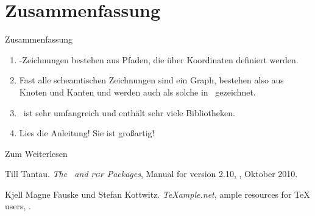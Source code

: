 \malte

\section*{Zusammenfassung}

\begin{frame}{Zusammenfassung}
  \begin{enumerate}
    \item \TikZ-Zeichnungen bestehen aus \alert{Pfaden}, die über \alert{Koordinaten} definiert werden.
    \item Fast alle scheamtischen Zeichnungen sind ein \alert{Graph}, bestehen also aus \alert{Knoten} und \alert{Kanten} und
      werden auch als solche in \TikZ\ gezeichnet.
    \item \TikZ\ ist sehr umfangreich und enthält \alert{sehr viele Bibliotheken}.
    \item \alert{Lies die Anleitung!} Sie ist großartig!
  \end{enumerate}
\end{frame}

\begin{Frame}{Zum Weiterlesen}
  \begin{mybib}
      Till Tantau.
      \newblock \emph{The \TikZ\ and \textsc{pgf} Packages},
      \newblock Manual for version 2.10,
      \newblock {}, Oktober 2010.

      Kjell Magne Fauske und Stefan Kottwitz.
      \newblock \emph{\TeX ample.net},
      \newblock ample resources for TeX users,
      \newblock {}.
  \end{mybib}
\end{Frame}
